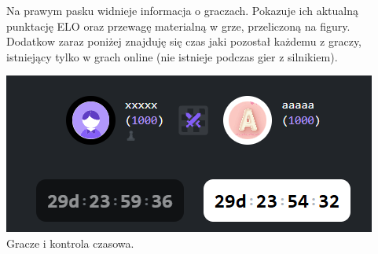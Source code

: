 \documentclass[12pt,a4paper]{article}
\begin{document}
\begin{minipage}[t]{0.45\textwidth} 
    \vspace{0pt} 
    \justifying 
    \noindent 
    Na prawym pasku widnieje informacja o graczach. Pokazuje ich aktualną punktację ELO oraz przewagę materialną w grze, przeliczoną na figury. Dodatkow zaraz poniżej znajduję się czas jaki pozostał każdemu z graczy, istniejący tylko w grach online (nie istnieje podczas gier z silnikiem).
\end{minipage} 
\hfill 
\begin{minipage}[t]{0.45\textwidth} 
    \vspace{0pt} 
    \centering 
    \includegraphics[width=\linewidth]{images/ins_min_players.png} 
    Gracze i kontrola czasowa.
\end{minipage}

\vspace{1cm}
\end{document}
